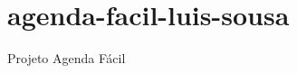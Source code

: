 \chapter{agenda-\/facil-\/luis-\/sousa}
\hypertarget{md_README}{}\label{md_README}
\label{md_README_autotoc_md0}%
%
Projeto Agenda Fácil 